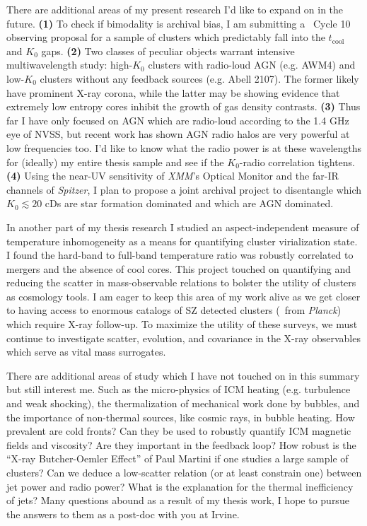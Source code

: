 \documentclass[11pt]{article}
\begin{document}
There are additional areas of my present research I'd like to expand
on in the future. {\bf(1)} To check if bimodality is archival bias, I am
submitting a \Chandra\ Cycle 10 observing proposal for a sample of
clusters which predictably fall into the $t_{\mathrm{cool}}$ and $K_0$
gaps. {\bf(2)} Two classes of peculiar objects warrant intensive
multiwavelength study: high-$K_0$ clusters with radio-loud AGN
(e.g. AWM4) and low-$K_0$ clusters without any feedback sources
(e.g. Abell 2107). The former likely have prominent X-ray corona,
while the latter may be showing evidence that extremely low entropy
cores inhibit the growth of gas density contrasts. {\bf(3)} Thus far I have
only focused on AGN which are radio-loud according to the 1.4 GHz eye
of NVSS, but recent work has shown AGN radio halos are very powerful
at low frequencies too. I'd like to know what the radio power is at
these wavelengths for (ideally) my entire thesis sample and see if the
$K_0$-radio correlation tightens. {\bf(4)} Using the near-UV sensitivity of
{\it XMM}'s Optical Monitor and the far-IR channels of {\it Spitzer},
I plan to propose a joint archival project to disentangle which $K_0
\lesssim 20$ cDs are star formation dominated and which are AGN
dominated.

In another part of my thesis research I studied an aspect-independent
measure of temperature inhomogeneity as a means for quantifying
cluster virialization state. I found the hard-band to full-band
temperature ratio was robustly correlated to mergers and the absence
of cool cores. This project touched on quantifying and reducing the
scatter in mass-observable relations to bolster the utility of
clusters as cosmology tools. I am eager to keep this area of my work
alive as we get closer to having access to enormous catalogs of SZ
detected clusters (\eg\ from {\it Planck}) which require X-ray follow-up. To
maximize the utility of these surveys, we must continue to investigate
scatter, evolution, and covariance in the X-ray observables which
serve as vital mass surrogates.

There are additional areas of study which I have not touched on in this
summary but still interest me. Such as the micro-physics of ICM
heating (e.g. turbulence and weak shocking), the thermalization of
mechanical work done by bubbles, and the importance of non-thermal
sources, like cosmic rays, in bubble heating. How prevalent are cold
fronts? Can they be used to robustly quantify ICM magnetic fields and
viscosity? Are they important in the feedback loop? How robust is the
``X-ray Butcher-Oemler Effect'' of Paul Martini if one studies a large
sample of clusters? Can we deduce a low-scatter relation (or at least
constrain one) between jet power and radio power? What is the
explanation for the thermal inefficiency of jets? Many questions
abound as a result of my thesis work, I hope to pursue the answers to
them as a post-doc with you at Irvine.
\end{document}

